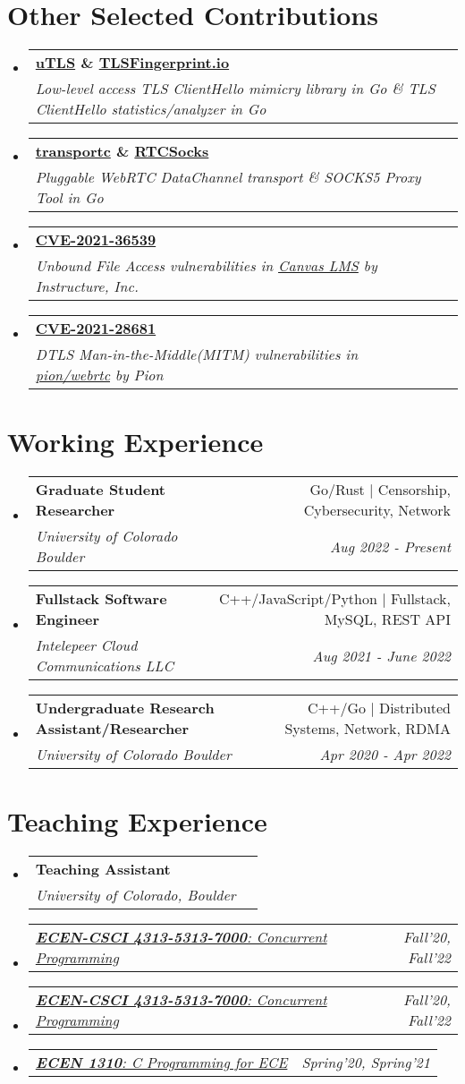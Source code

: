 \documentclass[letterpaper,11pt]{article}
\makeatletter
\newcommand{\resumeSubheading}[4]{
  \vspace{-2pt}\item
    \begin{tabular*}{0.97\textwidth}[t]{l@{\extracolsep{\fill}}r}
      \textbf{#1} & #2 \\
      \textit{\small#3} & \textit{\small #4} \\
    \end{tabular*}\vspace{-7pt}
}
\newcommand{\resumeSubSubheading}[2]{
    \item
    \begin{tabular*}{0.97\textwidth}{l@{\extracolsep{\fill}}r}
      \textit{\small#1} & \textit{\small #2} \\
    \end{tabular*}\vspace{-7pt}
}
\newcommand{\resumeSubHeadingListStart}{\begin{itemize}[leftmargin=0.15in, label={}]}
\newcommand{\resumeSubHeadingListEnd}{\end{itemize}}
\makeatother
\begin{document}
\section{Other Selected Contributions}
\resumeSubHeadingListStart
\resumeSubheading
{\href{https://github.com/refraction-networking/utls}{\textbf{uTLS}} \& \href{https://github.com/refraction-networking/tls-fingerprint}{\textbf{TLSFingerprint.io}}}{}
{Low-level access TLS ClientHello mimicry library in Go \& TLS ClientHello statistics/analyzer in Go}{}
\resumeSubheading
{\href{https://github.com/gaukas/transportc}{\textbf{transportc}} \& \href{https://github.com/gaukas/rtcsocks}{\textbf{RTCSocks}}}{}
{Pluggable WebRTC DataChannel transport \& SOCKS5 Proxy Tool in Go}{}
\resumeSubheading
{\href{https://cve.mitre.org/cgi-bin/cvename.cgi?name=CVE-2021-36539}{\textbf{CVE-2021-36539}}}{}
{Unbound File Access vulnerabilities in \href{https://www.instructure.com/canvas}{Canvas LMS} by \emph{Instructure, Inc.}}{}
\resumeSubheading
{\href{https://cve.mitre.org/cgi-bin/cvename.cgi?name=CVE-2021-28681}{\textbf{CVE-2021-28681}}}{}
{DTLS Man-in-the-Middle(MITM) vulnerabilities in \href{https://github.com/pion/webrtc}{pion/webrtc} by \emph{Pion}}{}
\resumeSubHeadingListEnd
\vspace{1pt}

\section{Working Experience}
\resumeSubHeadingListStart
\resumeSubheading
{Graduate Student Researcher}{Go/Rust $|$ Censorship, Cybersecurity, Network}
{University of Colorado Boulder}{Aug 2022 - Present}
\resumeSubheading
{Fullstack Software Engineer}{C++/JavaScript/Python $|$ Fullstack, MySQL, REST API}
{Intelepeer Cloud Communications LLC}{Aug 2021 - June 2022}
\resumeSubheading
{Undergraduate Research Assistant/Researcher}{C++/Go $|$ Distributed Systems, Network, RDMA}
{University of Colorado Boulder}{Apr 2020 - Apr 2022}
\resumeSubHeadingListEnd
\vspace{1pt}

\section{Teaching Experience}
\resumeSubHeadingListStart
\resumeSubheading
{Teaching Assistant}{}
{University of Colorado, Boulder}{}
\resumeSubSubheading
{\href{https://experts.colorado.edu/display/coursename_ECEN-4133}{\textbf{ECEN-CSCI 4313-5313-7000}: Concurrent Programming}}{Fall'20, Fall'22}
\resumeSubSubheading
{\href{https://experts.colorado.edu/display/coursename_ECEN-4313}{\textbf{ECEN-CSCI 4313-5313-7000}: Concurrent Programming}}{Fall'20, Fall'22}
\resumeSubSubheading
{\href{https://experts.colorado.edu/display/coursename_ECEN-1310}{\textbf{ECEN 1310}: C Programming for ECE}}{Spring'20, Spring'21}\resumeSubHeadingListEnd
\vspace{1pt}
\end{document}
